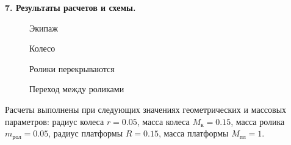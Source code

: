 % 

% 

% 

% 



{\bf 7. Результаты расчетов и схемы.}

\begin{figure}[H]
        \centering
        \caption{Экипаж}
        \label{fig:vehicle}
    \endminipage
        \centering
        \caption{Колесо}
        \label{fig:wheel}
    \endminipage
\end{figure}

\begin{figure}[H]
        \centering
        \caption{Ролики перекрываются}
        \label{fig:overlap}
    \endminipage
        \centering
        \caption{Переход между роликами}
        \label{fig:change}
    \endminipage
\end{figure}

Расчеты выполнены при следующих значениях геометрических и массовых параметров: радиус колеса $r = 0.05$, масса колеса $ M_{\text{к}} = 0.15$, масса ролика $m_{\text{рол}} = 0.05$, радиус платформы $R = 0.15$, масса платформы $M_{\text{пл}} = 1$.





